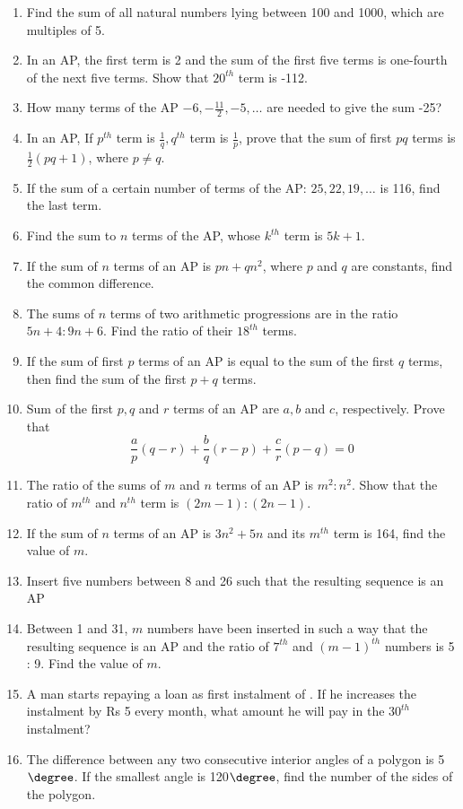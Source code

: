 \begin{enumerate}[label=\thesubsection.\arabic*, ref=\thesubsection.\theenumi]
\item Find the sum of all natural numbers lying between 100 and 1000,  which are multiples of 5.
\item In an AP,  the first term is 2 and the sum of the first five terms is one-fourth of the next five terms. Show that $20^{th}$ term is -112.
\item How many terms of the AP  $-6, -\frac{11}{2},  -5, \dots $ are needed to give the sum -25?
\item In an AP,  If $p^{th}$ term is $\frac{1}{q}, q^{th}$ term is $\frac{1}{p}$,  prove that the sum of first $pq$ terms is $\frac{1}{2}(pq+1)$,  where $p \neq q.$
\item  If the sum of a certain number of terms of the AP: $25,  22,  19,  \dots $  is 116, find the last term.
\item Find the sum to $n$ terms of the AP,  whose $k^{th}$ term is $5k + 1$.
\item If the sum of $n$ terms of an AP is $pn + qn^2$,  where $p$ and $q$ are constants,  find the common difference.
\item The sums of $n$ terms of two arithmetic progressions are in the ratio $5n + 4 : 9n + 6$. Find the ratio of their $18^{th}$ terms.
\item If the sum of first $p$ terms of an AP is equal to the sum of the first $q$ terms,  then find the sum of the first $p + q$ terms.
\item Sum of the first $p,  q$ and $r$ terms of an AP are $a,  b$ and $c$,  respectively. Prove that
$$\frac{a}{p}(q-r)+\frac{b}{q}(r-p)+\frac{c}{r}(p-q) = 0$$
\item The ratio of the sums of $m$ and $n$ terms of an AP is $m^2 : n^2$. Show that the ratio of 
$m^{th}$ and $n^{th}$ term is $(2m - 1) : (2n - 1)$.
\item If the sum of $n$ terms of an AP is $3n^2 + 5n$ and its $m^{th}$ term is 164,  find the value
of $m$.
\item Insert five numbers between 8 and 26 such that the resulting sequence is an AP
\item Between 1 and 31,  $m$ numbers have been inserted in such a way that the resulting sequence is an AP and the ratio of $7^{th}$ and $(m - 1)^{th}$ numbers is 5 : 9. Find the value of $m$.
\item A man starts repaying a loan as first instalment of . If he increases the
instalment by Rs 5 every month,  what amount he will pay in the $30^{th}$ instalment?
\item The difference between any two consecutive interior angles of a polygon is 5$\degree$. If the smallest angle is 120$\degree$,  find the number of the sides of the polygon. 

\end{enumerate}
